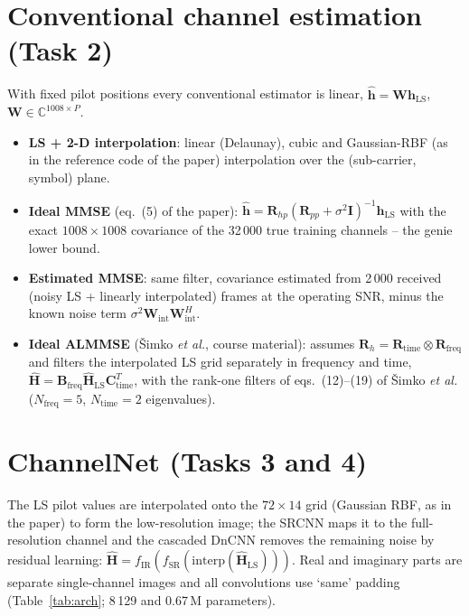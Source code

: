 \documentclass[10pt,a4paper]{article}
\newcommand{\HLS}{\mathbf{h}_{\mathrm{LS}}}
\begin{document}
\section{Conventional channel estimation (Task 2)}

With fixed pilot positions every conventional estimator is linear, $\hat{\mathbf h} = \mathbf W\HLS$,
$\mathbf W\in\mathbb C^{1008\times P}$.
\begin{itemize}
  \item \textbf{LS + 2-D interpolation}: linear (Delaunay), cubic and Gaussian-RBF (as in the reference code
    of the paper) interpolation over the (sub-carrier, symbol) plane.
  \item \textbf{Ideal MMSE} (eq.~(5) of the paper): $\hat{\mathbf h} = \mathbf R_{hp}(\mathbf R_{pp} +
    \sigma^2\mathbf I)^{-1}\HLS$ with the exact $1008\times1008$ covariance of the 32\,000 true training
    channels -- the genie lower bound.
  \item \textbf{Estimated MMSE}: same filter, covariance estimated from 2\,000 received (noisy LS +
    linearly interpolated) frames at the operating SNR, minus the known noise term
    $\sigma^2\mathbf W_{\mathrm{int}}\mathbf W_{\mathrm{int}}^H$.
  \item \textbf{Ideal ALMMSE} (\v{S}imko \emph{et al.}, course material): assumes
    $\mathbf R_h = \mathbf R_{\mathrm{time}}\otimes\mathbf R_{\mathrm{freq}}$ and filters the interpolated
    LS grid separately in frequency and time, $\hat{\mathbf H} = \mathbf B_{\mathrm{freq}}\hat{\mathbf
    H}_{\mathrm{LS}}\mathbf C_{\mathrm{time}}^T$, with the rank-one filters of eqs.~(12)--(19) of \v{S}imko \emph{et al.}
    ($N_{\mathrm{freq}}=5$, $N_{\mathrm{time}}=2$ eigenvalues).
\end{itemize}

\section{ChannelNet (Tasks 3 and 4)}

The LS pilot values are interpolated onto the $72\times14$ grid (Gaussian RBF, as in the paper) to form the
low-resolution image; the SRCNN maps it to the full-resolution channel and the cascaded DnCNN removes the
remaining noise by residual learning: $\hat{\mathbf H} = f_{\mathrm{IR}}(f_{\mathrm{SR}}(\mathrm{interp}
(\hat{\mathbf H}_{\mathrm{LS}})))$. Real and imaginary parts are separate single-channel images and all
convolutions use `same' padding (Table~\ref{tab:arch}; 8\,129 and 0.67\,M parameters).
\end{document}
